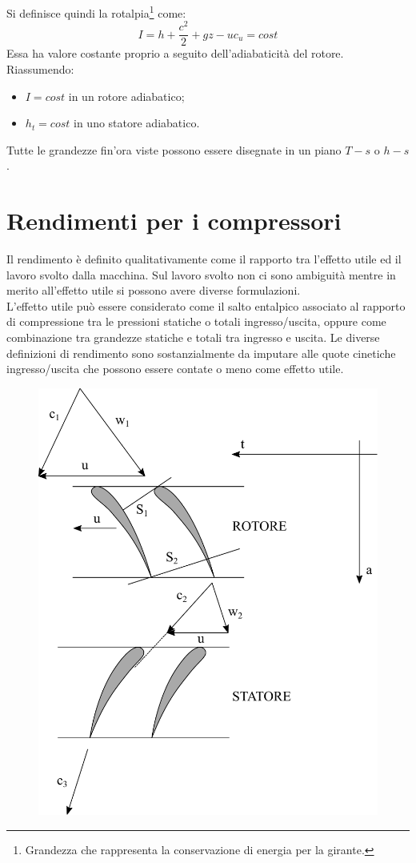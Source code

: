 Si definisce quindi la rotalpia\footnote{Grandezza che rappresenta la conservazione di energia per la girante.} come:
\begin{equation}
I=h+\frac{c^2}{2}+gz-u c_u = cost
\end{equation}
Essa ha valore costante proprio a seguito dell'adiabaticità del rotore.\\
Riassumendo:
\begin{itemize}
\item $I=cost$ in un rotore adiabatico;
\item $h_t=cost$ in uno statore adiabatico.
\end{itemize}
Tutte le grandezze fin'ora viste possono essere disegnate in un piano $T-s$ o $h-s$.
\section{Rendimenti per i compressori}
Il rendimento è definito qualitativamente come il rapporto tra l'effetto utile ed il lavoro svolto dalla macchina. Sul lavoro svolto non ci sono ambiguità mentre in merito all'effetto utile si possono avere diverse formulazioni.\\
L'effetto utile può essere considerato come il salto entalpico associato al rapporto di compressione tra le pressioni statiche o totali ingresso/uscita, oppure come combinazione tra grandezze statiche e totali tra ingresso e uscita. Le diverse definizioni di rendimento sono sostanzialmente da imputare alle quote cinetiche ingresso/uscita che possono essere contate o meno come effetto utile.
\begin{figure}
\centering
  \includegraphics[width=.5\textwidth]{fig/schieraTComp.pdf}
\caption{}
\label{fig:schieraTComp}
\end{figure}
